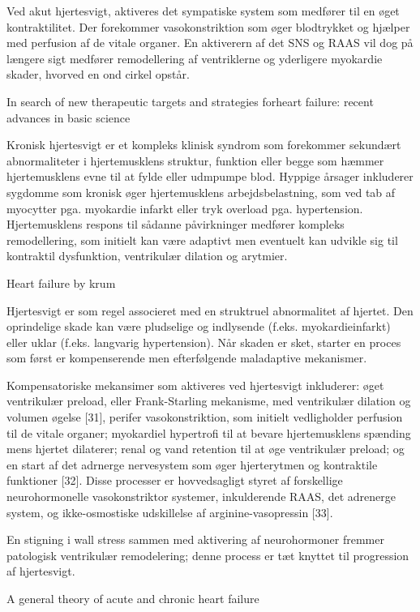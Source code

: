 Ved akut hjertesvigt, aktiveres det sympatiske system som medfører til en øget kontraktilitet. Der forekommer vasokonstriktion som øger blodtrykket og hjælper med perfusion af de vitale organer. En aktiverern af det SNS og RAAS vil dog på længere sigt medfører remodellering af ventriklerne og yderligere myokardie skader, hvorved en ond cirkel opstår. 


In search of new therapeutic targets and strategies forheart failure: recent advances in basic science

Kronisk hjertesvigt er et kompleks klinisk syndrom som forekommer sekundært abnormaliteter i hjertemusklens struktur, funktion eller begge som hæmmer hjertemusklens evne til at fylde eller udmpumpe blod. Hyppige årsager inkluderer sygdomme som kronisk øger hjertemusklens arbejdsbelastning, som ved tab af myocytter pga. myokardie infarkt eller tryk overload pga. hypertension. Hjertemusklens respons til sådanne påvirkninger medfører kompleks remodellering, som initielt kan være adaptivt men eventuelt kan udvikle sig til kontraktil dysfunktion, ventrikulær dilation og arytmier. 

Heart failure by krum

Hjertesvigt er som regel associeret med en struktruel abnormalitet af hjertet. Den oprindelige skade kan være pludselige og indlysende (f.eks. myokardieinfarkt) eller uklar (f.eks. langvarig hypertension). Når skaden er sket, starter en proces som først er kompenserende men efterfølgende maladaptive mekanismer. 

Kompensatoriske mekansimer som aktiveres ved hjertesvigt inkluderer: øget ventrikulær preload, eller Frank-Starling mekanisme, med ventrikulær dilation og volumen øgelse [31], perifer vasokonstriktion, som initielt vedligholder perfusion til de vitale organer; myokardiel hypertrofi til at bevare hjertemusklens spænding mens hjertet dilaterer; renal og vand retention til at øge ventrikulær preload; og en start af det adrnerge nervesystem som øger hjerterytmen og kontraktile funktioner [32]. Disse processer er hovvedsagligt styret af forskellige neurohormonelle vasokonstriktor systemer, inkulderende RAAS, det adrenerge system, og ikke-osmostiske udskillelse af arginine-vasopressin [33].

En stigning i wall stress sammen med aktivering af neurohormoner fremmer patologisk ventrikulær remodelering; denne process er tæt knyttet til progression af hjertesvigt.

A general theory of acute and chronic heart failure

